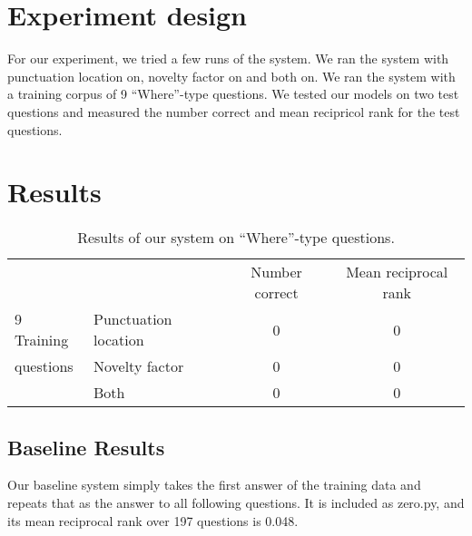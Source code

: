 \documentclass{article}
\begin{document}
\section{Experiment design}
For our experiment, we tried a few runs of the system. We ran the system with
punctuation location on, novelty factor on and both on.
We ran the system with a training corpus of 9 ``Where''-type questions.
We tested our models on two test questions and measured the number correct and
mean recipricol rank for the test questions.

\section{Results}
\begin{table}
\begin{tabular}{llcc}
\cmidrule{2-4}
               &       & Number correct & Mean reciprocal rank\\
\cmidrule{2-4}
9 Training&Punctuation location &   0            &      0              \\
questions&Novelty factor       &    0           &       0             \\
&Both                 &             0  &                0    \\
\cmidrule{2-4}
\end{tabular}
\caption{\label{tab:results}Results of our system on ``Where''-type questions. }
\end{table}

\subsection{Baseline Results}
Our baseline system simply takes the first answer of the training data and
repeats that as the answer to all following questions. It is included as
zero.py, and its mean reciprocal rank over 197 questions is 0.048.  
\end{document}
